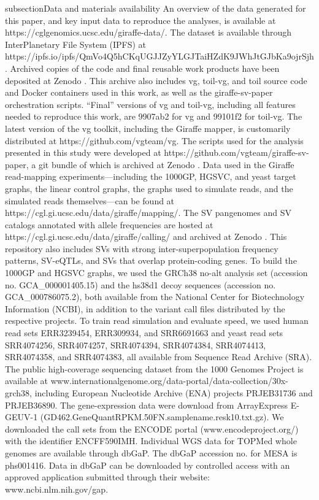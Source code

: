 \documentclass[11pt]{ucscthesis}
\begin{document}
subsection{Data and materials availability}
\label{sec:code-data}
An overview of the data generated for this paper, and key input data to reproduce the analyses, is available at https://cglgenomics.ucsc.edu/giraffe-data/.
The dataset is available through InterPlanetary File System (IPFS) at https://ipfs.io/ipfs/QmVo4Q5hCKqUGJJZyYLGJTaiHZdK9JWhJtGJbKa9ojrSjh.
Archived copies of the code and final reusable work products have been deposited at Zenodo \cite{zenodocode}.
This archive also includes vg, toil-vg, and toil source code and Docker containers used in this work, as well as the giraffe-sv-paper orchestration scripts.
“Final” versions of vg and toil-vg, including all features needed to reproduce this work, are 9907ab2 for vg and 99101f2 for toil-vg.
The latest version of the vg toolkit, including the Giraffe mapper, is customarily distributed at https://github.com/vgteam/vg.
The scripts used for the analysis presented in this study were developed at https://github.com/vgteam/giraffe-sv-paper, a git bundle of which is archived at Zenodo \cite{zenodocode}.
Data used in the Giraffe read-mapping experiments—including the 1000GP, HGSVC, and yeast target graphs, the linear control graphs, the graphs used to simulate reads, and the simulated reads themselves—can be found at https://cgl.gi.ucsc.edu/data/giraffe/mapping/.
The SV pangenomes and SV catalogs annotated with allele frequencies are hosted at https://cgl.gi.ucsc.edu/data/giraffe/calling/ and archived at Zenodo \cite{zenodocode}.
This repository also includes SVs with strong inter-superpopulation frequency patterns, SV-eQTLs, and SVs that overlap protein-coding genes.
To build the 1000GP and HGSVC graphs, we used the GRCh38 no-alt analysis set (accession no. GCA\_000001405.15) and the hs38d1 decoy sequences (accession no. GCA\_000786075.2), both available from the National Center for Biotechnology Information (NCBI), in addition to the variant call files distributed by the respective projects. To train read simulation and evaluate speed, we used human read sets ERR3239454, ERR309934, and SRR6691663 and yeast read sets SRR4074256, SRR4074257, SRR4074394, SRR4074384, SRR4074413, SRR4074358, and SRR4074383, all available from Sequence Read Archive (SRA).
The public high-coverage sequencing dataset from the 1000 Genomes Project \cite{1000gp_nygc_2021} is available at www.internationalgenome.org/data-portal/data-collection/30x-grch38, including European Nucleotide Archive (ENA) projects PRJEB31736 and PRJEB36890.
The gene-expression data were download from ArrayExpress E-GEUV-1 (GD462.GeneQuantRPKM.50FN.samplename.resk10.txt.gz).
We downloaded the call sets from the ENCODE portal \cite{sloan_encode_2016} (www.encodeproject.org/) with the identifier ENCFF590IMH.
Individual WGS data for TOPMed whole genomes are available through dbGaP.
The dbGaP accession no. for MESA is phs001416.
Data in dbGaP can be downloaded by controlled access with an approved application submitted through their website: www.ncbi.nlm.nih.gov/gap.
\end{document}
